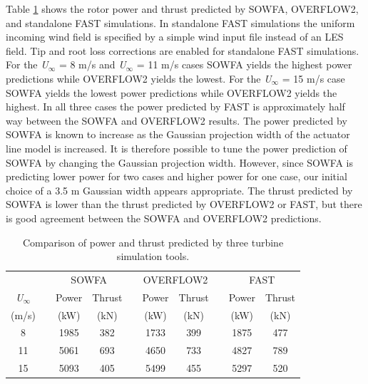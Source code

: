 Table \ref{Table3} shows the rotor power and thrust predicted by SOWFA, OVERFLOW2, and standalone FAST simulations. In standalone FAST simulations the uniform incoming wind field is specified by a simple wind input file instead of an LES field. Tip and root loss corrections are enabled for standalone FAST simulations. For the \emph{U$_{\infty}$}  = 8 m/s and \emph{U$_{\infty}$}  = 11 m/s cases SOWFA yields the highest power predictions while OVERFLOW2 yields the lowest. For the \emph{U$_{\infty}$}  = 15 m/s case SOWFA yields the lowest power predictions while OVERFLOW2 yields the highest. In all three cases the power predicted by FAST is approximately half way between the SOWFA and OVERFLOW2 results. The power predicted by SOWFA is known to increase as the Gaussian projection width of the actuator line model is increased. It is therefore possible to tune the power prediction of SOWFA by changing the Gaussian projection width. However, since SOWFA is predicting lower power for two cases and higher power for one case, our initial choice of a 3.5 m Gaussian width appears appropriate. The thrust predicted by SOWFA is lower than the thrust predicted by OVERFLOW2 or FAST, but there is good agreement between the SOWFA and OVERFLOW2 predictions.




\begin{table}[htbp]
\centering
\begin{tabular}{c c c c c c c c c c}
\hline
 & & \multicolumn{2}{c}{SOWFA} & & \multicolumn{2}{c}{OVERFLOW2} & & \multicolumn{2}{c}{FAST}\\
\cline{3-4} \cline{6-7} \cline{9-10} 
\emph{U$_{\infty}$}  & & {Power} & {Thrust} & & {Power} & {Thrust} & & {Power} & {Thrust} \\
{(m/s)} & & {(kW)} & {(kN)} & & {(kW)} & {(kN)} & & {(kW)} & {(kN)}\\
\hline
8   & & 1985 & 382 & & 1733 & 399 & & 1875 & 477\\
11 & & 5061 & 693 & & 4650 & 733 & & 4827 & 789\\
15 & & 5093 & 405 & & 5499 & 455 & & 5297 & 520\\
\hline
\end{tabular}
\caption{ Comparison of power and thrust predicted by three turbine simulation tools.}
\label{Table3}
\end{table}

